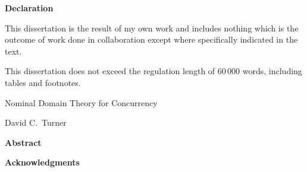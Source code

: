 \documentclass[oneside,titlepage,a4paper]{book}
\begin{document}
\cleardoublepage

\vspace*{60mm}
\textbf{\Large Declaration}
\vspace{10mm}

This dissertation is the result of my own work and includes
nothing which is the outcome of work done in collaboration except
where specifically indicated in the text.

\bigskip
This dissertation does not exceed the regulation length of $60\,000$
words, including tables and footnotes.

\cleardoublepage
\begin{center}
\Large Nominal Domain Theory for Concurrency
\end{center}
\begin{center}
\large David C.~Turner
\end{center}
\vspace{10mm}
\begin{center}
\textbf{\large Abstract}
\end{center}



\clearpage

\textbf{\large Acknowledgments}



\clearpage
\pagestyle{headings}


\tableofcontents



















\vfill\pagebreak














\end{document}
